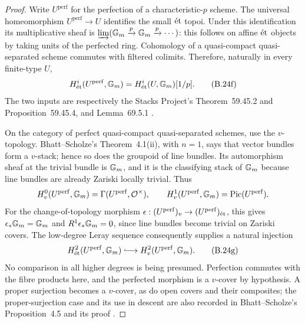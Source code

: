 \begin{proof}
Write \(U^{\mathrm{perf}}\) for the perfection of a
characteristic-\(p\) scheme.  The universal homeomorphism
\(U^{\mathrm{perf}}\to U\) identifies the small \(\mathrm{\acute et}\)
topoi.  Under this identification its multiplicative sheaf is
\(\varinjlim({\mathbb G_m}\xrightarrow{p}{\mathbb G_m}\xrightarrow{p}\cdots)\):
this follows on affine \(\mathrm{\acute et}\) objects by taking units of the
perfected ring.  Cohomology of a quasi-compact quasi-separated
scheme commutes with filtered colimits.  Therefore, naturally
in every finite-type \(U\),
\[
 H^i_{\mathrm{\acute et}}(U^{\mathrm{perf}},{\mathbb G_m})
       =H^i_{\mathrm{\acute et}}(U,{\mathbb G_m})[1/p].                     \tag{B.24f}
\]
The two inputs are respectively the Stacks Project's
Theorem~59.45.2 and Proposition~59.45.4, and Lemma~69.5.1
\cite{BStacksPerfectEtale,BStacksCohomColimits}.

On the category of perfect quasi-compact quasi-separated
schemes, use the \(v\)-topology.  Bhatt--Scholze's
Theorem~4.1(ii), with \(n=1\), says that vector bundles form
a \(v\)-stack; hence so does the groupoid of line bundles.
Its automorphism sheaf at the trivial bundle is \({\mathbb G_m}\),
and it is the classifying stack of \({\mathbb G_m}\) because line
bundles are already Zariski locally trivial.  Thus
\[
 H^0_v(U^{\mathrm{perf}},{\mathbb G_m})
       =\Gamma(U^{\mathrm{perf}},\mathcal O^\times),
 \qquad
 H^1_v(U^{\mathrm{perf}},{\mathbb G_m})
       =\operatorname{Pic}(U^{\mathrm{perf}}).
\]
For the change-of-topology morphism
\(\epsilon:(U^{\mathrm{perf}})_v\to
(U^{\mathrm{perf}})_{\mathrm{\acute et}}\), this gives
\(\epsilon_*{\mathbb G_m}={\mathbb G_m}\) and \(R^1\epsilon_*{\mathbb G_m}=0\),
since line bundles become trivial on Zariski covers.
The low-degree Leray sequence consequently supplies a natural
injection
\[
 H^2_{\et}(U^{\mathrm{perf}},\Gm)
       \lhook\joinrel\longrightarrow
 H^2_v(U^{\mathrm{perf}},\Gm).                     \tag{B.24g}
\]
No comparison in all higher degrees is being presumed.
Perfection commutes with the fibre products here, and the
perfected morphism is a \(v\)-cover by hypothesis.
A proper surjection becomes a \(v\)-cover, as do open
covers and their composites; the proper-surjection case and
its use in descent are also recorded in
Bhatt--Scholze's Proposition~4.5 and its proof
\cite[Theorem~4.1(ii), Proposition~4.5, author-version
pp.~15--17]{BBhattScholze2017}.


\end{proof}
